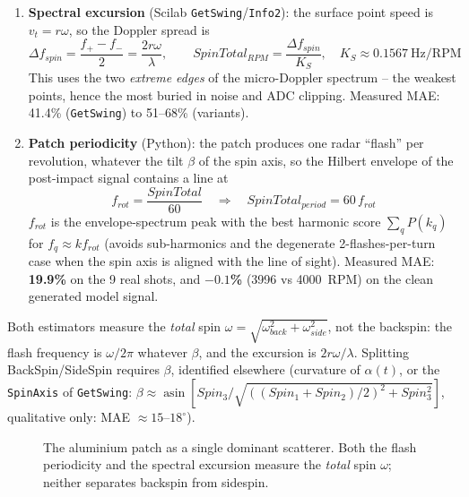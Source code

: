 \documentclass[10pt,a4paper]{report}
\begin{document}
\begin{enumerate}
  \item \textbf{Spectral excursion} (Scilab \texttt{GetSwing}/\texttt{Info2}): the surface point speed is $v_t = r\omega$, so the Doppler spread is
  \begin{equation}
  \Delta f_{spin} = \frac{f_+ - f_-}{2} = \frac{2r\omega}{\lambda}, \qquad
  SpinTotal_{RPM} = \frac{\Delta f_{spin}}{K_S}, \quad K_S \approx 0.1567\ \text{Hz/RPM}
  \end{equation}
  This uses the two \emph{extreme edges} of the micro-Doppler spectrum -- the weakest points, hence the most buried in noise and ADC clipping. Measured MAE: 41.4\% (\texttt{GetSwing}) to 51--68\% (variants).

  \item \textbf{Patch periodicity} (Python): the patch produces one radar ``flash'' per revolution, whatever the tilt $\beta$ of the spin axis, so the Hilbert envelope of the post-impact signal contains a line at
  \begin{equation}
  f_{rot} = \frac{SpinTotal}{60} \quad\Longrightarrow\quad \boxed{SpinTotal_{period} = 60\,f_{rot}}
  \end{equation}
  $f_{rot}$ is the envelope-spectrum peak with the best harmonic score $\sum_q P(k_q)$ for $f_q \approx k f_{rot}$ (avoids sub-harmonics and the degenerate 2-flashes-per-turn case when the spin axis is aligned with the line of sight). Measured MAE: \textbf{19.9\%} on the 9 real shots, and \textbf{$-0.1$\%} (3996 vs 4000~RPM) on the clean generated model signal.
\end{enumerate}

Both estimators measure the \emph{total} spin $\omega = \sqrt{\omega_{back}^2+\omega_{side}^2}$, not the backspin: the flash frequency is $\omega/2\pi$ whatever $\beta$, and the excursion is $2r\omega/\lambda$. Splitting BackSpin/SideSpin requires $\beta$, identified elsewhere (curvature of $\alpha(t)$, or the \texttt{SpinAxis} of \texttt{GetSwing}: $\beta \approx \operatorname{asin}[Spin_3/\sqrt{((Spin_1+Spin_2)/2)^2+Spin_3^2}]$, qualitative only: MAE $\approx 15$--$18^\circ$).

\begin{figure}[H]\centering
{}
\caption{The aluminium patch as a single dominant scatterer. Both the flash periodicity and the spectral excursion measure the \emph{total} spin $\omega$; neither separates backspin from sidespin.}
\label{fig:patch}
\end{figure}
\end{document}
